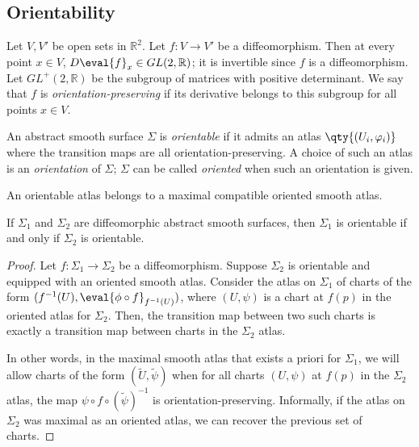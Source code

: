 \subsection{Orientability}
\begin{definition}
	Let $V, V'$ be open sets in $\mathbb R^2$.
	Let $f \colon V \to V'$ be a diffeomorphism.
	Then at every point $x \in V$, $D\eval{f}_x \in GL(2,\mathbb R)$; it is invertible since $f$ is a diffeomorphism.
	Let $GL^+(2,\mathbb R)$ be the subgroup of matrices with positive determinant.
	We say that $f$ is \textit{orientation-preserving} if its derivative belongs to this subgroup for all points $x \in V$.
\end{definition}
\begin{definition}
	An abstract smooth surface $\Sigma$ is \textit{orientable} if it admits an atlas $\qty{(U_i, \varphi_i)}$ where the transition maps are all orientation-preserving.
	A choice of such an atlas is an \textit{orientation} of $\Sigma$; $\Sigma$ can be called \textit{oriented} when such an orientation is given.
\end{definition}
\begin{remark}
	An orientable atlas belongs to a maximal compatible oriented smooth atlas.
\end{remark}
\begin{lemma}
	If $\Sigma_1$ and $\Sigma_2$ are diffeomorphic abstract smooth surfaces, then $\Sigma_1$ is orientable if and only if $\Sigma_2$ is orientable.
\end{lemma}
\begin{proof}
	Let $f \colon \Sigma_1 \to \Sigma_2$ be a diffeomorphism.
	Suppose $\Sigma_2$ is orientable and equipped with an oriented smooth atlas.
	Consider the atlas on $\Sigma_1$ of charts of the form $(f^{-1}(U), \eval{\phi \circ f}_{f^{-1}(U)})$, where $(U, \psi)$ is a chart at $f(p)$ in the oriented atlas for $\Sigma_2$.
	Then, the transition map between two such charts is exactly a transition map between charts in the $\Sigma_2$ atlas.

	In other words, in the maximal smooth atlas that exists a priori for $\Sigma_1$, we will allow charts of the form $(\widetilde U, \widetilde \psi)$ when for all charts $(U, \psi)$ at $f(p)$ in the $\Sigma_2$ atlas, the map $\psi \circ f \circ (\widetilde \psi)^{-1}$ is orientation-preserving.
	Informally, if the atlas on $\Sigma_2$ was maximal as an oriented atlas, we can recover the previous set of charts.
\end{proof}

